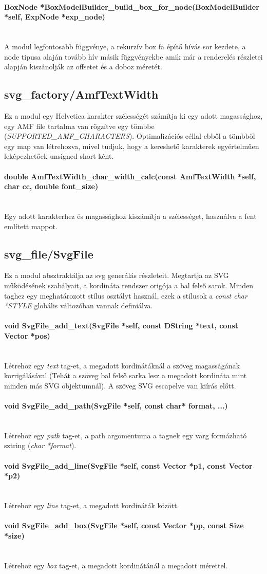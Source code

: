 \documentclass{article}[12pt,a4paper]
\newcommand{\fn}[1]{\paragraph{#1}\mbox{}\\}
\begin{document}
    \fn{BoxNode *BoxModelBuilder\_build\_box\_for\_node(BoxModelBuilder *self, ExpNode *exp\_node)}
    A modul legfontosabb függvénye, a rekurzív box fa építő hívás sor kezdete, a node tipusa alaján tovább hív másik függvényekbe amik már a renderelés részletei alapján kiszánolják az offsetet és a doboz méretét.

    \subsection{svg\_factory/AmfTextWidth}
    Ez a modul egy Helvetica karakter szélességét számítja ki egy adott magassághoz, egy AMF file tartalma van rögzítve egy tömbbe (\textit{SUPPORTED\_AMF\_CHARACTERS}).
    Optimalizációs céllal ebből a tömbből egy map van létrehozva, mivel tudjuk, hogy a kereshető karakterek egyértelműen leképezhetőek unsigned short ként.

    \fn{double AmfTextWidth\_char\_width\_calc(const AmfTextWidth *self, char cc, double font\_size)}
    Egy adott karakterhez és magassághoz kiszámítja a szélességet, használva a fent említett mappot.

    \subsection{svg\_file/SvgFile}
    Ez a modul absztraktálja az svg generálás részleteit.
    Megtartja az SVG működésének szabályait, a kordináta rendszer origója a bal felső sarok.
    Minden taghez egy meghatározott stílus osztályt használ, ezek a stílusok a \textit{const char *STYLE} globális változóban vannak definiálva.

    \fn{void SvgFile\_add\_text(SvgFile *self, const DString *text, const Vector *pos)}
    Létrehoz egy \textit{text} tag-et, a megadott kordinátáknál a szöveg magasságának korrigálásával (Tehát a szöveg bal felső sarka lesz a megadott kordináta mint minden más SVG objektumnál).
    A szöveg SVG escapelve van kiírás előtt.

    \fn{void SvgFile\_add\_path(SvgFile *self, const char* format, ...)}
    Létrehoz egy \textit{path} tag-et, a path argomentuma a tagnek egy varg formázható sztring (\textit{char *format}).

    \fn{void SvgFile\_add\_line(SvgFile *self, const Vector *p1, const Vector *p2)}
    Létrehoz egy \textit{line} tag-et, a megadott kordináták között.

    \fn{void SvgFile\_add\_box(SvgFile *self, const Vector *pp, const Size *size)}
    Létrehoz egy \textit{box} tag-et, a megadott kordinátánál a megadott mérettel.
\end{document}
